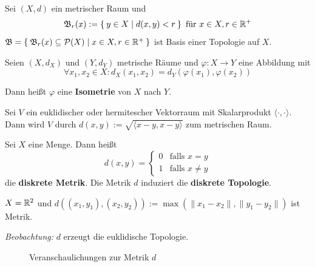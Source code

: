 \begin{bemerkung}
    Sei $(X, d)$ ein metrischer Raum und
    \[\mathfrak{B}_r(x) := \Set{y \in X | d(x,y) < r} \text{ für } x \in X, r \in \mathbb{R}^+\]
    $\mathfrak{B} = \Set{\mathfrak{B}_r(x) \subseteq \mathcal{P}(X) | x \in X, r \in \ensuremath{\mathbb{R}}^+}$ ist Basis einer Topologie auf $X$.
\end{bemerkung}

\begin{definition}%
    Seien $(X, d_X)$ und $(Y, d_Y)$ metrische Räume und $\varphi: X \rightarrow Y$
    eine Abbildung mit 
    \[\forall x_1, x_2 \in X: d_X(x_1, x_2) = d_Y(\varphi(x_1), \varphi(x_2)) \]

    Dann heißt $\varphi$ eine \textbf{Isometrie} von $X$ nach $Y$.
\end{definition}

\begin{beispiel}
    Sei $V$ ein euklidischer oder hermitescher Vektorraum mit Skalarprodukt
    $\langle \cdot , \cdot \rangle$.
    Dann wird $V$ durch $d(x,y) := \sqrt{\langle x-y, x-y \rangle}$ zum metrischen Raum.
\end{beispiel}

\begin{beispiel}%
    Sei $X$ eine Menge. Dann heißt
    \[d(x,y) = \begin{cases}
    0 & \text{falls } x=y\\
    1 & \text{falls } x \neq y
    \end{cases}\]
    die \textbf{diskrete Metrik}. Die Metrik $d$ induziert die 
    \textbf{diskrete Topologie}.
\end{beispiel}

\begin{beispiel}
    $X = \mathbb{R}^2$ und $d\left ((x_1, y_1), (x_2, y_2)\right ) := \max(\|x_1 - x_2\|, \|y_1 - y_2\|)$
    ist Metrik.

    \emph{Beobachtung:} $d$ erzeugt die euklidische Topologie.

    \begin{figure}[ht]
        \centering
        \subfloat[$\fB_r(0)$]{
            
            \label{fig:open-square}
        }%
        \label{fig:metrik}
        \caption{Veranschaulichungen zur Metrik $d$}
    \end{figure}

\end{beispiel}

